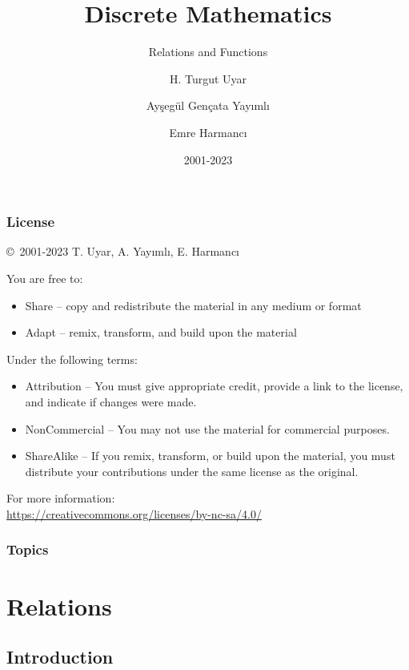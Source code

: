 \documentclass[dvipsnames]{beamer}
\title{Discrete Mathematics}
\subtitle{Relations and Functions}
\author{H. Turgut Uyar \and Ayşegül Gençata Yayımlı \and Emre Harmancı}
\date{2001-2023}
\begin{document}
\begin{frame}
  \titlepage
\end{frame}

\begin{frame}
  \frametitle{License}

  \hfill
  \copyright~2001-2023 T. Uyar, A. Yayımlı, E. Harmancı

  \vfill
  \begin{footnotesize}
    You are free to:
    \begin{itemize}
      \itemsep0em
      \item Share -- copy and redistribute the material in any medium or format
      \item Adapt -- remix, transform, and build upon the material
    \end{itemize}

    Under the following terms:
    \begin{itemize}
      \itemsep0em
      \item Attribution -- You must give appropriate credit, provide a link to
        the license, and indicate if changes were made.

      \item NonCommercial -- You may not use the material for commercial
        purposes.

      \item ShareAlike -- If you remix, transform, or build upon the material,
        you must distribute your contributions under the same license as the
        original.
    \end{itemize}
  \end{footnotesize}

  \begin{small}
    For more information:\\
    \url{https://creativecommons.org/licenses/by-nc-sa/4.0/}
  \end{small}
\end{frame}

\begin{frame}
  \frametitle{Topics}
  \tableofcontents
\end{frame}

\section{Relations}

\subsection{Introduction}
\end{document}
